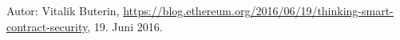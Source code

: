\begin{thebibliography}{99}

 Autor: Vitalik Buterin, \url{https://blog.ethereum.org/2016/06/19/thinking-smart-contract-security}, 19. Juni 2016.

\end{thebibliography}

